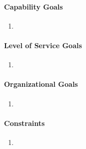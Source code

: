 \paragraph{Capability Goals}\begin{enumerate}
	\item
\end{enumerate}

\paragraph{Level of Service Goals}\begin{enumerate}
	\item
\end{enumerate}

\paragraph{Organizational Goals}\begin{enumerate}
	\item
\end{enumerate}

\paragraph{Constraints}\begin{enumerate}
	\item
\end{enumerate}